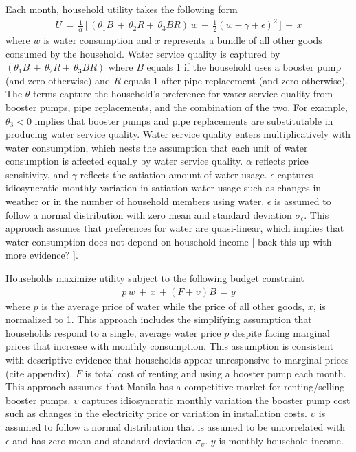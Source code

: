 \documentclass[12pt,table]{article}
\begin{document}
Each month, household utility takes the following form
\begin{align}
\label{eq:utility}
U\,=\,\frac{1}{\alpha} \, \Big[ \,  ( \theta_1 B \, +  \, \theta_2 R + \, \theta_3 B R ) \,  w  \, -\, \frac{1}{2}(w - \gamma + \epsilon)^2 \, \Big] \, + \, x
\end{align}
where $w$ is water consumption and $x$ represents a bundle of all other goods consumed by the household.  Water service quality is captured by $( \theta_1 B \, +  \, \theta_2 R + \, \theta_3 B R )$ where $B$ equals 1 if the household uses a booster pump (and zero otherwise) and $R$ equals 1 after pipe replacement (and zero otherwise).  The $\theta$ terms capture the household's preference for water service quality from booster pumps, pipe replacements, and the combination of the two.  For example, $\theta_3<0$ implies that booster pumps and pipe replacements are substitutable in producing water service quality.  Water service quality enters multiplicatively with water consumption, which nests the assumption that each unit of water consumption is affected equally by water service quality.  $\alpha$ reflects price sensitivity, and $\gamma$ reflects the satiation amount of water usage.  $\epsilon$ captures idiosyncratic monthly variation in satiation water usage such as changes in weather or in the number of household members using water.  $\epsilon$ is assumed to follow a normal distribution with zero mean and standard deviation $\sigma_{\epsilon}$.  This approach assumes that preferences for water are quasi-linear, which implies that water consumption does not depend on household income [ back this up with more evidence? ].  

Households maximize utility subject to the following budget constraint
\begin{align}
\label{eq:bc}
p\,w \,+\, x \, + (F + \upsilon) B \, = y 
\end{align}
where $p$ is the average price of water while the price of all other goods, $x$, is normalized to 1.  This approach includes the simplifying assumption that households respond to a single, average water price $p$ despite facing marginal prices that increase with monthly consumption.  This assumption is consistent with descriptive evidence that households appear unresponsive to marginal prices (cite appendix).   $F$ is total cost of renting and using a booster pump each month.  This approach assumes that Manila has a competitive market for renting/selling booster pumps.  $\upsilon$ captures idiosyncratic monthly variation the booster pump cost such as changes in the electricity price or variation in installation costs. $\upsilon$ is assumed to follow a normal distribution that is assumed to be uncorrelated with $\epsilon$ and has zero mean and standard deviation $\sigma_{\upsilon}$.  $y$ is monthly household income.  
\end{document}
